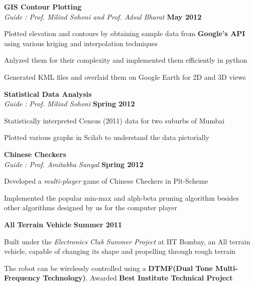 \documentclass[margin,11pt]{resume}
\begin{document}
\begin{resume}
\textbf{GIS Contour Plotting}\vspace{1mm} \hfill\\ 
\textsl{Guide : Prof. Milind Sohoni and Prof. Adsul Bharat}	\hfill \textbf{May 2012}\vspace{-4mm}\\
				\begin{list2}
				\item Plotted elevation and contours by obtaining sample data from \textbf{Google's API} using various kriging and interpolation techniques 
				\item Anlyzed them for their complexity and implemented them efficiently in python 
				\item Generated KML files and overlaid them on Google Earth for 2D and 3D views
				\end{list2}				\vspace{-2.75mm} 


\textbf{Statistical Data Analysis}\vspace{1mm} \hfill\\ 
\textsl{Guide : Prof. Milind Sohoni}	\hfill \textbf{Spring 2012} \vspace{-5mm}\\
				\begin{list2}
				\item Statistically interpreted Census (2011) data for two suburbs of Mumbai
				\item Plotted various graphs in Scilab to understand the data pictorially	
				\end{list2}
				\vspace{-2.75mm} 

    \textbf{Chinese Checkers}\vspace{1mm} \hfill\\
		\textsl{Guide : Prof. Amitabha Sanyal} \hfill \textbf{Spring 2012} \vspace{-5mm}\\
				\begin{list2}
				\item
				Developed a \emph{multi-player} game of Chinese Checkers in Plt-Scheme
				\item Implemented the popular min-max and alph-beta pruning algorithm besides other algorithms designed by us for the computer player
				\end{list2} \vspace{-2.75mm} 
\textbf{All Terrain Vehicle}\vspace{1mm} \hfill
\textbf{Summer 2011} \vspace{-5mm} \\
		 \begin{list2}
    \item
		 Built under the \emph{Electronics Club Summer Project} at IIT Bombay, an All terrain vehicle, capable of changing its shape  and propelling through rough terrain 
		 \item The robot can be wirelessly controlled using a \textbf{DTMF(Dual Tone Multi-Frequency Technology)}. Awarded \textbf{Best Institute Technical Project}
\end{list2} \vspace{-1.75mm}  


\end{resume}
\end{document}
